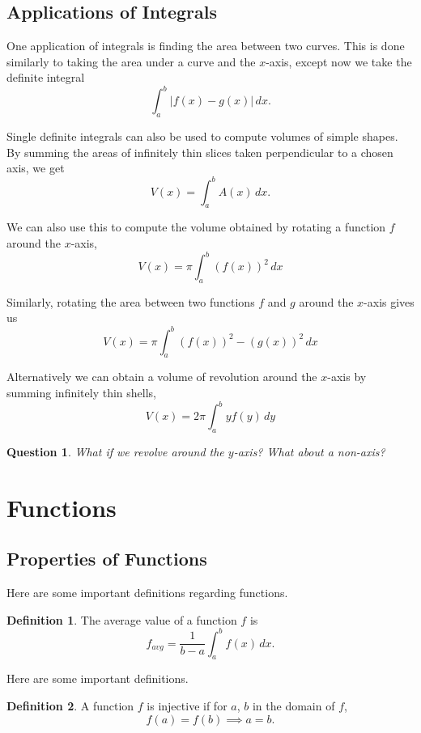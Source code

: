\documentclass[11pt]{scrartcl}
\theoremstyle{plain}
\newtheorem*{question}{Question}
\theoremstyle{definition}
\newtheorem*{definition}{Definition}
\theoremstyle{remark}
\begin{document}
\subsection{Applications of Integrals}

One application of integrals is finding the area between two curves. This is done similarly to taking the area under a curve and the $x$-axis, except now we take the definite integral
\[ \int_{a}^{b} \lvert f(x)-g(x) \rvert  \, dx . \]

Single definite integrals can also be used to compute volumes of simple shapes. By summing the areas of infinitely thin slices taken perpendicular to a chosen axis, we get
\[ V(x)=\int_{a}^{b} A(x) \, dx . \]

We can also use this to compute the volume obtained by rotating a function $f$ around the $x$-axis,
\[ V(x)=\pi \int_{a}^{b} \left(f(x)\right)^{2} \, dx  \]

Similarly, rotating the area between two functions $f$ and $g$ around the $x$-axis gives us
\[ V(x)=\pi \int_{a}^{b} \left(f(x)\right)^{2} - \left(g(x)\right)^{2} \, dx  \]

Alternatively we can obtain a volume of revolution around the $x$-axis by summing infinitely thin shells,
\[ V(x)=2\pi \int_{a}^{b} yf(y) \, dy  \]

\begin{question}
    What if we revolve around the $y$-axis? What about a non-axis?
\end{question}

\newpage
\section{Functions}

\subsection{Properties of Functions}

Here are some important definitions regarding functions.

\begin{definition}
    The average value of a function $f$ is 
    \[f_{avg}=\frac{1}{b-a}\int_{a}^{b} f(x) \, dx.\]
\end{definition}

Here are some important definitions.

\begin{definition}
    A function $f$ is injective if for $a$, $b$ in the domain of $f$,
    \[f(a)=f(b)\implies a=b.\]
\end{definition}
\end{document}
